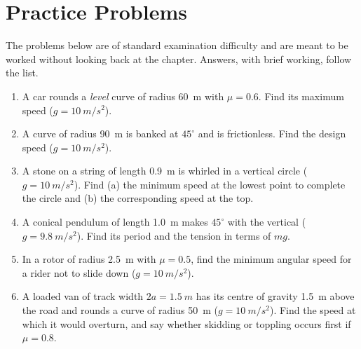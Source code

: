 \section{Practice Problems}\label{sec:practice10}

The problems below are of standard examination difficulty and are meant to be worked without looking back at the chapter. Answers, with brief working, follow the list.

\begin{enumerate}[itemsep=3pt]
\item A car rounds a \emph{level} curve of radius \SI{60}{m} with $\mu=0.6$. Find its maximum speed
      ($g=\SI{10}{m/s^2}$).
\item A curve of radius \SI{90}{m} is banked at $45^\circ$ and is frictionless. Find the design speed ($g=\SI{10}{m/s^2}$).
\item A stone on a string of length \SI{0.9}{m} is whirled in a vertical circle ($g=\SI{10}{m/s^2}$). Find (a) the
      minimum speed at the lowest point to complete the circle and (b) the corresponding speed at the
      top.
\item A conical pendulum of length \SI{1.0}{m} makes $45^\circ$ with the vertical ($g=\SI{9.8}{m/s^2}$).
      Find its period and the tension in terms of $mg$.
\item In a rotor of radius \SI{2.5}{m} with $\mu=0.5$, find the minimum angular speed for a rider not to
      slide down ($g=\SI{10}{m/s^2}$).
\item A loaded van of track width $2a=\SI{1.5}{m}$ has its centre of gravity \SI{1.5}{m} above the road and
      rounds a curve of radius \SI{50}{m} ($g=\SI{10}{m/s^2}$). Find the speed at which it would overturn, and say
      whether skidding or toppling occurs first if $\mu=0.8$.
\end{enumerate}

